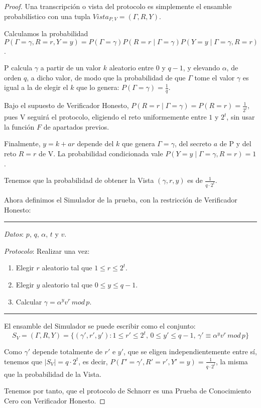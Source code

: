 \begin{proof}


Una transcripción o vista del protocolo es simplemente el ensamble probabilístico con una tupla $Vista_{P,V} =(\Gamma, R, Y)$.

Calculamos la probabilidad $P(\Gamma=\gamma, R=r, Y=y) = P(\Gamma=\gamma)P(R=r\mid \Gamma =\gamma)P(Y=y\mid \Gamma=\gamma, R=r)$.


P calcula $\gamma$ a partir de un valor $k$ aleatorio entre $0$ y $q-1$, y elevando $\alpha$, de orden $q$, a dicho valor, de modo que la probabilidad de que $\Gamma$ tome el valor $\gamma$ es igual a la de elegir el $k$ que lo genera: $P(\Gamma=\gamma)=\frac{1}{q}$.

Bajo el supuesto de Verificador Honesto, $P(R=r\mid \Gamma =\gamma)=P(R=r)=\frac{1}{2^t}$, pues V seguirá el protocolo, eligiendo el reto uniformemente entre $1$ y $2^t$, sin usar la función $F$ de apartados previos.

Finalmente, $y=k+ar$ depende del $k$ que genera $\Gamma=\gamma$, del secreto $a$ de P y del reto $R=r$ de V. La probabilidad condicionada vale $P(Y=y \mid \Gamma =\gamma, R=r)=1$.

Tenemos que la probabilidad de obtener la Vista $(\gamma, r, y)$ es de $\frac{1}{q\cdot 2^{t}}$.

\hfil

Ahora definimos el Simulador de la prueba, con la restricción de Verificador Honesto:


\rule{\textwidth}{1pt}
\begin{algorithm}
	
	\hfil
	
	\textit{Datos}: $p$, $q$, $\alpha$, $t$ y $v$.
	
	\textit{Protocolo}: Realizar una vez:
	
	\begin{enumerate}
		
		\item Elegir $r$ aleatorio tal que $1\leq r \leq 2^t$.
		\item Elegir $y$ aleatorio tal que $0\leq y \leq q-1$.
		\item Calcular $\gamma = \alpha ^y v^r \, mod \, p$.		
		
	\end{enumerate}
	
\end{algorithm}
\rule{\textwidth}{1pt}


El ensamble del Simulador se puede escribir como el conjunto:
\[
S_{V} = (\Gamma, R, Y) = \{ (\gamma', r', y') : 1\leq r' \leq 2^t,\, 0\leq y'\leq q-1,\, \gamma' \equiv \alpha^y v^r \, mod \, p \}
\]

Como $\gamma'$ depende totalmente de $r'$ e $y'$, que se eligen independientemente entre sí, tenemos que $\mid S_V \mid = q\cdot 2^t$, es decir, $P(\Gamma'=\gamma', R'=r', Y'=y)=\frac{1}{q\cdot 2^t}$, la misma que la probabilidad de la Vista. 


Tenemos por tanto, que el protocolo de Schnorr es una Prueba de Conocimiento Cero con Verificador Honesto.

\end{proof}

